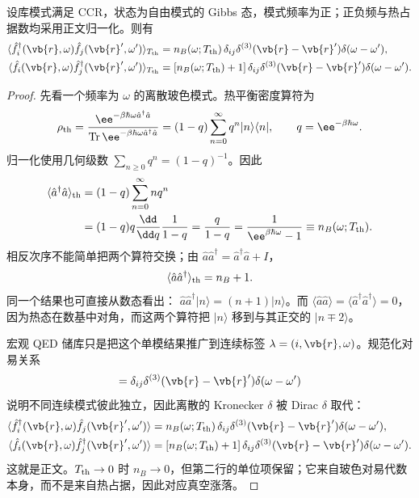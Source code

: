 \begin{proposition}[热高斯库的二点函数]
设库模式满足 CCR，状态为自由模式的 Gibbs 态，模式频率为正；正负频与热占据数均采用正文归一化。则有
\begin{align}
 \langle\hat f_i^\dagger(\vb{r},\omega)
 \hat f_j(\vb{r}',\omega')\rangle_{T_{\rm th}}
 &=n_B(\omega;T_{\rm th})\,
 \delta_{ij}\delta^{(3)}(\vb{r}-\vb{r}')\delta(\omega-\omega'),\notag\\
 \langle\hat f_i(\vb{r},\omega)
 \hat f_j^\dagger(\vb{r}',\omega')\rangle_{T_{\rm th}}
 &=[n_B(\omega;T_{\rm th})+1]\,
 \delta_{ij}\delta^{(3)}(\vb{r}-\vb{r}')\delta(\omega-\omega').
\label{eq:reservoir-thermal-correlators-dp43}
\end{align}
\end{proposition}
\begin{proof}
先看一个频率为 $\omega$ 的离散玻色模式。热平衡密度算符为
\begin{equation*}
 \rho_{\rm th}
 =\frac{\ee^{-\beta\hbar\omega\hat a^\dagger\hat a}}
 {\operatorname{Tr}\ee^{-\beta\hbar\omega\hat a^\dagger\hat a}}
 =(1-q)\sum_{n=0}^{\infty}q^n|n\rangle\langle n|,
 \qquad q=\ee^{-\beta\hbar\omega}.
\end{equation*}
归一化使用几何级数 $\sum_{n\ge0}q^n=(1-q)^{-1}$。因此
\begin{align*}
 \langle\hat a^\dagger\hat a\rangle_{\rm th}
 &=(1-q)\sum_{n=0}^{\infty}nq^n\\
 &=(1-q)q\frac{\dd}{\dd q}\frac{1}{1-q}
 =\frac{q}{1-q}
 =\frac{1}{\ee^{\beta\hbar\omega}-1}
 \equiv n_B(\omega;T_{\rm th}).
\end{align*}
相反次序不能简单把两个算符交换；由
$\hat a\hat a^\dagger=\hat a^\dagger\hat a+I$，
\begin{equation*}
 \langle\hat a\hat a^\dagger\rangle_{\rm th}
 =n_B+1.
\end{equation*}
同一个结果也可直接从数态看出：
$\hat a\hat a^\dagger|n\rangle=(n+1)|n\rangle$。而
$\langle\hat a\hat a\rangle=\langle\hat a^\dagger\hat a^\dagger\rangle=0$，因为热态在数基中对角，而这两个算符把 $|n\rangle$ 移到与其正交的 $|n\mp2\rangle$。

宏观 QED 储库只是把这个单模结果推广到连续标签
$\lambda=(i,\vb{r},\omega)$。规范化对易关系
\begin{equation*}
 [\hat f_i(\vb{r},\omega),
 \hat f_j^\dagger(\vb{r}',\omega')]
 =\delta_{ij}\delta^{(3)}(\vb{r}-\vb{r}')
 \delta(\omega-\omega')
\end{equation*}
说明不同连续模式彼此独立，因此离散的 Kronecker $\delta$ 被 Dirac $\delta$ 取代：
\begin{align*}
 \langle\hat f_i^\dagger(\vb{r},\omega)
 \hat f_j(\vb{r}',\omega')\rangle
 &=n_B(\omega;T_{\rm th})\,
 \delta_{ij}\delta^{(3)}(\vb{r}-\vb{r}')\delta(\omega-\omega'),\\
 \langle\hat f_i(\vb{r},\omega)
 \hat f_j^\dagger(\vb{r}',\omega')\rangle
 &=[n_B(\omega;T_{\rm th})+1]\,
 \delta_{ij}\delta^{(3)}(\vb{r}-\vb{r}')\delta(\omega-\omega').
\end{align*}
这就是正文。$T_{\rm th}\to0$ 时 $n_B\to0$，但第二行的单位项保留；它来自玻色对易代数本身，而不是来自热占据，因此对应真空涨落。
\end{proof}

